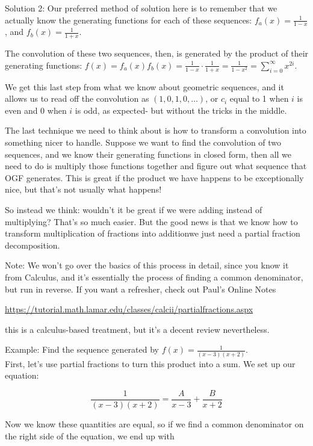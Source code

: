 \documentclass{article}
\begin{document}
Solution 2: Our preferred method of solution here is to remember that we actually know the generating functions for each of these sequences: $f_{a}(x)=\frac{1}{1-x}$, and $f_{b}(x)=\frac{1}{1+x}$.

The convolution of these two sequences, then, is generated by the product of their generating functions: $f(x)=f_{a}(x) f_{b}(x)=\frac{1}{1-x} \cdot \frac{1}{1+x}=\frac{1}{1-x^{2}}=\sum_{i=0}^{\infty} x^{2 i}$.

We get this last step from what we know about geometric sequences, and it allows us to read off the convolution as $(1,0,1,0, \ldots)$, or $c_{i}$ equal to 1 when $i$ is even and 0 when $i$ is odd, as expected- but without the tricks in the middle.

The last technique we need to think about is how to transform a convolution into something nicer to handle. Suppose we want to find the convolution of two sequences, and we know their generating functions in closed form, then all we need to do is multiply those functions together and figure out what sequence that OGF generates. This is great if the product we have happens to be exceptionally nice, but that's not usually what happens!

So instead we think: wouldn't it be great if we were adding instead of multiplying? That's so much easier. But the good news is that we know how to transform multiplication of fractions into additionwe just need a partial fraction decomposition.

Note: We won't go over the basics of this process in detail, 
since you know it from Calculus, and it's essentially the 
process of finding a common denominator, but run in reverse. 
If you want a refresher, check out Paul's Online Notes 


\href{https://tutorial.math.lamar.edu/classes/calcii/partialfractions.aspx}{https://tutorial.math.lamar.edu/classes/calcii/partialfractions.aspx}

this is a calculus-based treatment, 
but it's a decent review nevertheless.

Example: Find the sequence generated by $f(x)=\frac{1}{(x-3)(x+2)}$.\\
First, let's use partial fractions to turn this product into a sum. We set up our equation:

$$
\frac{1}{(x-3)(x+2)}=\frac{A}{x-3}+\frac{B}{x+2}
$$

Now we know these quantities are equal, so if we find a common denominator on the right side of the equation, we end up with
\end{document}
